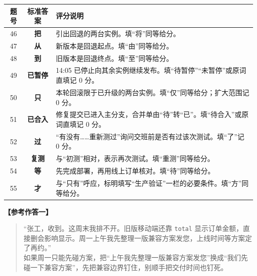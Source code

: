 \documentclass[UTF8, zihao=5, a4paper, fontset=fandol]{ctexart}
\begin{document}


\begin{center}
\renewcommand{\arraystretch}{1.28}
\begin{tabularx}{\linewidth}{|c|c|X|}
\hline
\textbf{题号} & \textbf{标准答案} & \textbf{评分说明} \\
\hline
46 & \textbf{把} & 引出回退的两台实例。填“将”同等给分。 \\
\hline
47 & \textbf{从} & 新版本是回退起点。填“由”同等给分。 \\
\hline
48 & \textbf{到} & 旧版本是回退终点。填“至”同等给分。 \\
\hline
49 & \textbf{已暂停} & 14:05 已停止向其余实例继续发布。填“待暂停”“未暂停”或原词直填记 0 分。 \\
\hline
50 & \textbf{只} & 本轮回滚限于已升级的两台实例。填“仅”同等给分；扩大范围记 0 分。 \\
\hline
51 & \textbf{已合入} & 修复提交已进入主分支，合并单由“待”转“已”。填“待合入”或原词直填记 0 分。 \\
\hline
52 & \textbf{过} & “有没有……重新测过”询问交班前是否有过该次测试。填“了”记 0 分。 \\
\hline
53 & \textbf{复测} & 与“初测”相对，表示再次测试。填“重测”同等给分。 \\
\hline
54 & \textbf{等} & 先完成部署，再用线上订单核对。填“待”同等给分。 \\
\hline
55 & \textbf{才} & 与“只有”呼应，标明填写“生产验证”一栏的必要条件。填“方”同等给分。 \\
\hline
\end{tabularx}
\end{center}



\noindent\textbf{【参考作答一】}

\begin{quote}
\vspace{-2pt}
\kaishu\noindent
“张工，收到。这周末我排不开。旧版移动端还靠 \texttt{total} 显示订单金额，直接删会影响显示。周一上午我先整理一版兼容方案发您，上线时间等方案定了再约。”\\[1pt]
如果周一只能先碰方案，把“上午我先整理一版兼容方案发您”换成“我们先碰一下兼容方案”，先把兼容边界钉住，别顺手把交付时间也钉死。
\vspace{-2pt}
\end{quote}
\end{document}
